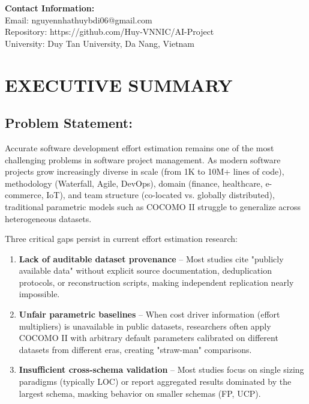 \documentclass[11pt,a4paper]{article}
\begin{document}
\vspace{2cm}

\noindent \textbf{Contact Information:}\\
Email: nguyennhathuybdi06@gmail.com\\
Repository: https://github.com/Huy-VNNIC/AI-Project\\
University: Duy Tan University, Da Nang, Vietnam

\newpage

\section*{EXECUTIVE SUMMARY}

\subsection*{Problem Statement:}
Accurate software development effort estimation remains one of the most challenging problems in software project management. As modern software projects grow increasingly diverse in scale (from 1K to 10M+ lines of code), methodology (Waterfall, Agile, DevOps), domain (finance, healthcare, e-commerce, IoT), and team structure (co-located vs. globally distributed), traditional parametric models such as COCOMO II struggle to generalize across heterogeneous datasets. 

Three critical gaps persist in current effort estimation research:
\begin{enumerate}
    \item \textbf{Lack of auditable dataset provenance} -- Most studies cite "publicly available data" without explicit source documentation, deduplication protocols, or reconstruction scripts, making independent replication nearly impossible.
    \item \textbf{Unfair parametric baselines} -- When cost driver information (effort multipliers) is unavailable in public datasets, researchers often apply COCOMO II with arbitrary default parameters calibrated on different datasets from different eras, creating "straw-man" comparisons.
    \item \textbf{Insufficient cross-schema validation} -- Most studies focus on single sizing paradigms (typically LOC) or report aggregated results dominated by the largest schema, masking behavior on smaller schemas (FP, UCP).
\end{enumerate}
\end{document}
